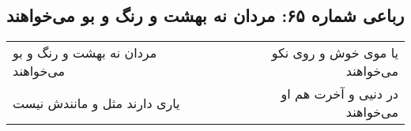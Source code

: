 \begin{center}
\section*{رباعی شماره ۶۵: مردان نه بهشت و رنگ و بو می‌خواهند}
\label{sec:065}
\begin{longtable}{l p{0.5cm} r}
مردان نه بهشت و رنگ و بو می‌خواهند
&&
یا موی خوش و روی نکو می‌خواهند
\\
یاری دارند مثل و مانندش نیست
&&
در دنیی و آخرت هم او می‌خواهند
\\
\end{longtable}
\end{center}
